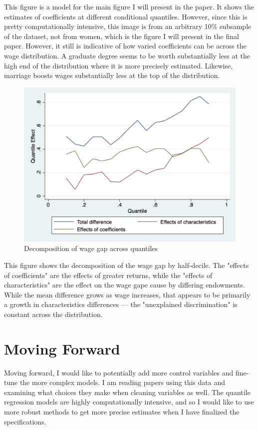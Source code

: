 \documentclass[12pt]{article}
\begin{document}
This figure is a model for the main figure I will present in the paper. It shows the estimates of coefficients at different conditional quantiles. However, since this is pretty computationally intensive, this image is from an arbitrary 10\% subsample of the dataset, not from women, which is the figure I will present in the final paper. However, it still is indicative of how varied coefficients can be across the wage distribution. A graduate degree seems to be worth substantially less at the high end of the distribution where it is more precisely estimated. Likewise, marriage boosts wages substantially less at the top of the distribution.

\newpage

\begin{figure}
	\centering
	\includegraphics[width=.6\textwidth]{../../paper/figures/mm-decomp-wordy-syntax.png}
	\caption{Decomposition of wage gap across quantiles}
\end{figure}	

This figure shows the decomposition of the wage gap by half-decile.  The "effects of coefficients" are the effects of greater returns, while the "effects of characteristics" are the effect on the wage gape cause by differing endowments. While the mean difference grows as wage increases, that appears to be primarily a growth in characteristics differences --- the "unexplained discrimination" is constant across the distribution.

\section{Moving Forward}

Moving forward, I would like to potentially add more control variables and fine-tune the more complex models. I am reading papers using this data and examining what choices they make when cleaning variables as well. The quantile regression models are highly computationally intensive, and so I would like to use more robust methods to get more precise estimates when I have finalized the specifications.
\end{document}
